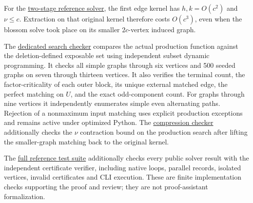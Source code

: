For the \href{https://github.com/icekylinx/algorithm-frontier/blob/main/problems/general-matching/reference/cover-compression-proof.md}{two-stage reference solver}, the first edge kernel has \(h,k=O(c^2)\) and \(\nu\leq c\). Extraction on that original kernel therefore costs \(O(c^3)\), even when the blossom solve took place on its smaller \(2c\)-vertex induced graph.

The \href{https://github.com/icekylinx/algorithm-frontier/blob/main/problems/general-matching/verify/check_certificate_search.py}{dedicated search checker} compares the actual production function against the deletion-defined exposable set using independent subset dynamic programming. It checks all simple graphs through six vertices and 500 seeded graphs on seven through thirteen vertices. It also verifies the terminal count, the factor-criticality of each outer block, its unique external matched edge, the perfect matching on \(U\), and the exact odd-component count. For graphs through nine vertices it independently enumerates simple even alternating paths. Rejection of a nonmaximum input matching uses explicit production exceptions and remains active under optimized Python. The \href{https://github.com/icekylinx/algorithm-frontier/blob/main/problems/general-matching/verify/check_cover_compression.py}{compression checker} additionally checks the \(\nu\) contraction bound on the production search after lifting the smaller-graph matching back to the original kernel.

The \href{https://github.com/icekylinx/algorithm-frontier/blob/main/problems/general-matching/verify/check_reference.py}{full reference test suite} additionally checks every public solver result with the independent certificate verifier, including native loops, parallel records, isolated vertices, invalid certificates and CLI execution. These are finite implementation checks supporting the proof and review; they are not proof-assistant formalization.

